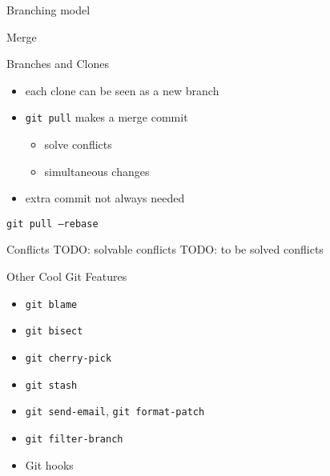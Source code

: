 \documentclass{beamer}
\begin{document}
\begin{frame}{Branching model}
  \begin{center}
  \end{center}
\end{frame}

\begin{frame}{Merge}
  \begin{center}
  \end{center}
\end{frame}

\begin{frame}{Branches and Clones}
  \begin{itemize}
    \item each clone can be seen as a new branch
    \item \texttt{git pull} makes a merge commit
      \begin{itemize}
        \item solve conflicts
        \item simultaneous changes
      \end{itemize}
    \item extra commit not always needed
  \end{itemize}
\end{frame}

\begin{frame}{\texttt{git pull --rebase}}
  \begin{center}
  \end{center}
\end{frame}

\begin{frame}{Conflicts}
  TODO: solvable conflicts
  TODO: to be solved conflicts
\end{frame}

\begin{frame}{Other Cool Git Features}
  \begin{itemize}
    \item \texttt{git blame}
    \item \texttt{git bisect}
    \item \texttt{git cherry-pick}
    \item \texttt{git stash}
    \item \texttt{git send-email}, \texttt{git format-patch}
    \item \texttt{git filter-branch}
    \item Git hooks
  \end{itemize}
\end{frame}
\end{document}
